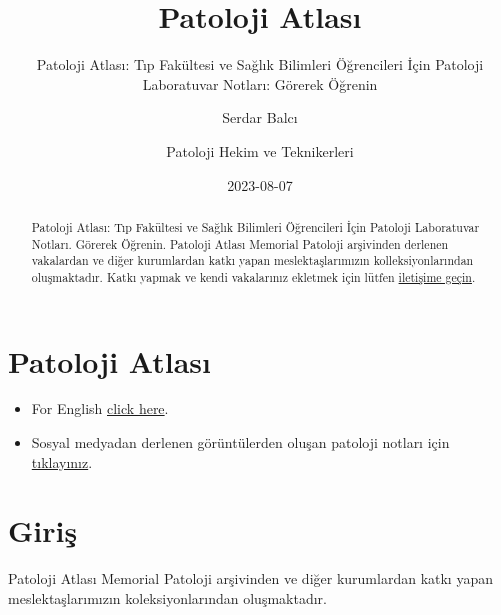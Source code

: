 \documentclass[
  letterpaper,
  DIV=11,
  numbers=noendperiod]{scrreprt}
\title{Patoloji Atlası}
\subtitle{Patoloji Atlası: Tıp Fakültesi ve Sağlık Bilimleri Öğrencileri
İçin Patoloji Laboratuvar Notları: Görerek Öğrenin}
\author{Serdar Balcı \and Patoloji Hekim ve Teknikerleri}
\date{2023-08-07}
\renewcommand*\contentsname{Içindekiler}
\newcommand\contentsname{Içindekiler}
\begin{document}
\maketitle
\begin{abstract}
Patoloji Atlası: Tıp Fakültesi ve Sağlık Bilimleri Öğrencileri İçin
Patoloji Laboratuvar Notları. Görerek Öğrenin. Patoloji Atlası Memorial
Patoloji arşivinden derlenen vakalardan ve diğer kurumlardan katkı yapan
meslektaşlarımızın kolleksiyonlarından oluşmaktadır. Katkı yapmak ve
kendi vakalarınız ekletmek için lütfen
\href{https://www.patolojiatlasi.com/katki.html}{iletişime geçin}.
\end{abstract}
\ifdefined\Shaded\renewenvironment{Shaded}{\begin{tcolorbox}[boxrule=0pt, sharp corners, enhanced, frame hidden, interior hidden, borderline west={3pt}{0pt}{shadecolor}, breakable]}{\end{tcolorbox}}\fi

\renewcommand*\contentsname{İçindekiler}
{
\hypersetup{linkcolor=}
\setcounter{tocdepth}{1}
\tableofcontents
}

\hypertarget{sec-patoloji-atlasi}{%
\chapter*{Patoloji Atlası}\label{sec-patoloji-atlasi}}


\begin{itemize}
\item
  For English \href{https://www.histopathologyatlas.com/}{click here}.
\item
  Sosyal medyadan derlenen görüntülerden oluşan patoloji notları için
  \href{https://www.patolojinotlari.com/}{tıklayınız}.\\
\end{itemize}


\hypertarget{sec-giris}{%
\chapter*{Giriş}\label{sec-giris}}


Patoloji Atlası Memorial Patoloji arşivinden ve diğer kurumlardan katkı
yapan meslektaşlarımızın koleksiyonlarından oluşmaktadır.
\end{document}
